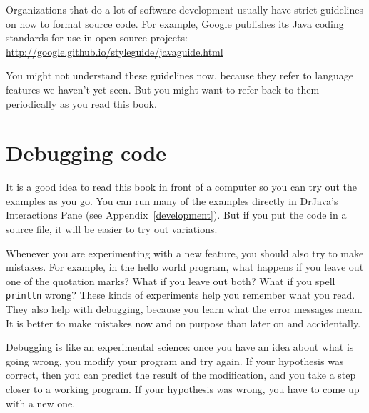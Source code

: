 \documentclass[12pt]{book}
\theoremstyle{exercise}
\newcommand{\java}[1]{\verb"#1"}
\begin{document}

Organizations that do a lot of software development usually have strict guidelines on how to format source code.
For example, Google publishes its Java coding standards for use in open-source projects:
\url{http://google.github.io/styleguide/javaguide.html}


You might not understand these guidelines now, because they refer to language features we haven't yet seen.
But you might want to refer back to them periodically as you read this book.



\section{Debugging code}
\label{sec:examples}

It is a good idea to read this book in front of a computer so you can try out the examples as you go.
You can run many of the examples directly in DrJava's Interactions Pane (see Appendix~\ref{development}).
But if you put the code in a source file, it will be easier to try out variations.

Whenever you are experimenting with a new feature, you should also try to make mistakes.
For example, in the hello world program, what happens if you leave out one of the quotation marks?
What if you leave out both?
What if you spell \java{println} wrong?
These kinds of experiments help you remember what you read.
They also help with debugging, because you learn what the error messages mean.
It is better to make mistakes now and on purpose than later on and accidentally.



Debugging is like an experimental science: once you have an idea about what is going wrong, you modify your program and try again.
If your hypothesis was correct, then you can predict the result of the modification, and you take a step closer to a working program.
If your hypothesis was wrong, you have to come up with a new one.
\end{document}
